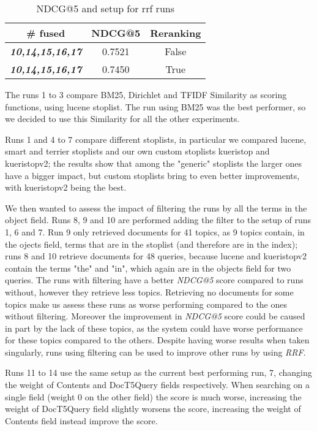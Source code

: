 \begin{table}
	\caption{NDCG@5 and setup for rrf runs}
	\label{tab:results-rrf-table}
	\centering
	\begin{tabular}{|c|c|c|}
		\toprule
		\# fused & NDCG@5 & Reranking \\
		\midrule
		\textit{\textbf{10,14,15,16,17}} & 0.7521 & False \\
		\textit{\textbf{10,14,15,16,17}} & 0.7450 & True \\
		\bottomrule
	\end{tabular}
\end{table}

The runs 1 to 3 compare BM25, Dirichlet and TFIDF Similarity as scoring functions, using lucene stoplist.
The run using BM25 was the best performer, so we decided to use this Similarity for all the other experiments.

Runs 1 and 4 to 7 compare different stoplists, in particular we compared lucene, smart and terrier stoplists and our own custom stoplists kueristop and kueristopv2; the results show that among the "generic" stoplists the larger ones have a bigger impact, but custom stoplists bring to even better improvements, with kueristopv2 being the best.

We then wanted to assess the impact of filtering the runs by all the terms in the object field.
Runs 8, 9 and 10 are performed adding the filter to the setup of runs 1, 6 and 7.
Run 9 only retrieved documents for 41 topics, as 9 topics contain, in the ojects field, terms that are in the stoplist (and therefore are in the index); runs 8 and 10 retrieve documents for 48 queries, because lucene and kueristopv2 contain the terms "the" and "in", which again are in the objects field for two queries.
The runs with filtering have a better \textit{NDCG@5} score compared to runs without, however they retrieve less topics. Retrieving no documents for some topics make us assess these runs as worse performing compared to the ones without filtering. Moreover the improvement in \textit{NDCG@5} score could be caused in part by the lack of these topics, as the system could have worse performance for these topics compared to the others.
Despite having worse results when taken singularly, runs using filtering can be used to improve other runs by using \textit{RRF}.

Runs 11 to 14 use the same setup as the current best performing run, 7, changing the weight of Contents and DocT5Query fields respectively.
When searching on a single field (weight 0 on the other field) the score is much worse, increasing the weight of DocT5Query field slightly worsens the score, increasing the weight of Contents field instead improve the score.

